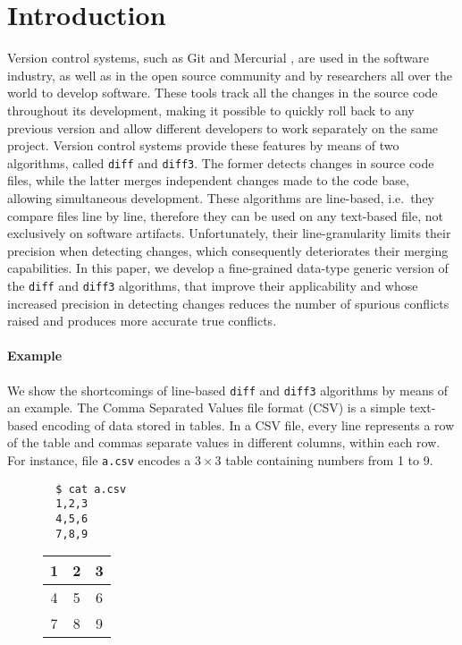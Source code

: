 \documentclass{sigplanconf}
\theoremstyle{plain}
\begin{document}
\section{Introduction}
\label{sec:intro}
Version control systems, such as Git \cite{Git} and Mercurial
\cite{Mercurial}, are used in the software industry, as well as in the
open source community and by researchers all over the world to develop
software.
%
These tools track all the changes in the source code throughout its
development, making it possible to quickly roll back to any previous
version and allow different developers to work separately on the same
project.
%
Version control systems provide these features by means of two
algorithms, called \texttt{diff} and \texttt{diff3}.
%
The former detects changes in source code files, while the latter
merges independent changes made to the code base, allowing
simultaneous development.
%
These algorithms are line-based, i.e.\ they compare files line by
line, therefore they can be used on any text-based file, not
exclusively on software artifacts.
%
Unfortunately, their line-granularity limits their precision when
detecting changes, which consequently deteriorates their merging
capabilities.
%
In this paper, we develop a fine-grained data-type generic version of
the \texttt{diff} and \texttt{diff3} algorithms, that improve their
applicability and whose increased precision in detecting changes
reduces the number of spurious conflicts raised and produces more
accurate true conflicts.

\paragraph{Example}
We show the shortcomings of line-based \texttt{diff} and
\texttt{diff3} algorithms by means of an example.  
%
The Comma Separated Values file format (CSV) is a simple text-based
encoding of data stored in tables. %
%
In a CSV file, every line represents a row of the table and commas
separate values in different columns, within each row.
%
For instance, file \texttt{a.csv} encodes a $3 \times 3$ table
containing numbers from 1 to 9.
\begin{figure}[!h]
\centering
\begin{minipage}{.15\textwidth}
{  \centering
  \begin{verbatim}
  $ cat a.csv
  1,2,3
  4,5,6
  7,8,9
  \end{verbatim}\par
}
\end{minipage}%
\begin{minipage}{.15\textwidth}
{  \centering
  \begin{tabular}{ | c | c | c | }
    \hline
    1 & 2 & 3 \\ \hline
    4 & 5 & 6 \\ \hline
    7 & 8 & 9  \\ \hline
  \end{tabular}\par
}
\end{minipage}%
\end{figure}
\end{document}
